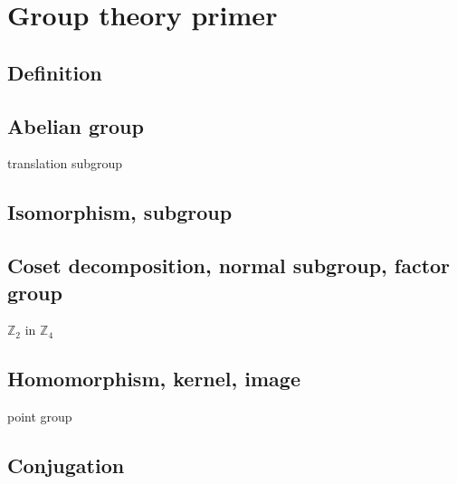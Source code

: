 \section{\label{sec:group_primer}Group theory primer}

\subsection{Definition}

\subsection{Abelian group}

translation subgroup

\subsection{Isomorphism, subgroup}

\subsection{Coset decomposition, normal subgroup, factor group}

$\mathbb{Z}_{2}$ in $\mathbb{Z}_{4}$

\subsection{Homomorphism, kernel, image}

point group

\subsection{Conjugation}
